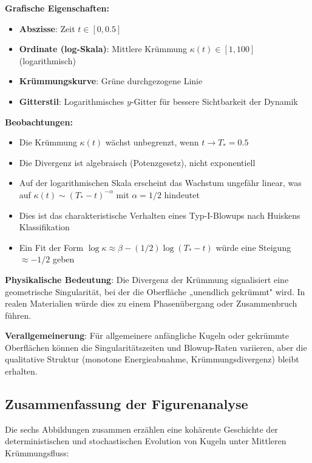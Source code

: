 \documentclass[a4paper,12pt]{article}
\theoremstyle{definition}
\begin{document}
\textbf{Grafische Eigenschaften:}
\begin{itemize}
	\item \textbf{Abszisse}: Zeit $t \in [0, 0.5]$
	\item \textbf{Ordinate (log-Skala)}: Mittlere Krümmung $\kappa(t) \in [1, 100]$ (logarithmisch)
	\item \textbf{Krümmungskurve}: Grüne durchgezogene Linie
	\item \textbf{Gitterstil}: Logarithmisches $y$-Gitter für bessere Sichtbarkeit der Dynamik
\end{itemize}

\textbf{Beobachtungen:}
\begin{itemize}
	\item Die Krümmung $\kappa(t)$ wächst unbegrenzt, wenn $t \to T_* = 0.5$
	\item Die Divergenz ist algebraisch (Potenzgesetz), nicht exponentiell
	\item Auf der logarithmischen Skala erscheint das Wachstum ungefähr linear, was auf $\kappa(t) \sim (T_* - t)^{-\alpha}$ mit $\alpha = 1/2$ hindeutet
	\item Dies ist das charakteristische Verhalten eines Typ-I-Blowups nach Huiskens Klassifikation
	\item Ein Fit der Form $\log \kappa \approx \beta - (1/2) \log(T_* - t)$ würde eine Steigung $\approx -1/2$ geben
\end{itemize}

\textbf{Physikalische Bedeutung}: Die Divergenz der Krümmung signalisiert eine geometrische Singularität, bei der die Oberfläche „unendlich gekrümmt" wird. In realen Materialien würde dies zu einem Phasenübergang oder Zusammenbruch führen.

\textbf{Verallgemeinerung}: Für allgemeinere anfängliche Kugeln oder gekrümmte Oberflächen können die Singularitätszeiten und Blowup-Raten variieren, aber die qualitative Struktur (monotone Energieabnahme, Krümmungsdivergenz) bleibt erhalten.

\subsection{Zusammenfassung der Figurenanalyse}

Die sechs Abbildungen zusammen erzählen eine kohärente Geschichte der deterministischen und stochastischen Evolution von Kugeln unter Mittleren Krümmungsfluss:
\end{document}
